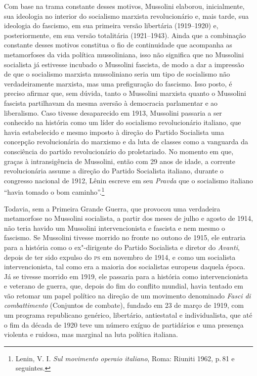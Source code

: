 Com base na trama constante desses motivos, Mussolini elaborou,
inicialmente, sua ideologia no interior do socialismo marxista
revolucionário e, mais tarde, sua ideologia do fascismo, em sua primeira
versão libertária (1919--1920) e, posteriormente, em sua versão
totalitária (1921--1943). Ainda que a combinação constante desses motivos
constitua o fio de continuidade que acompanha as metamorfoses da vida
política mussoliniana, isso não significa que no Mussolini socialista já
estivesse incubado o Mussolini fascista, de modo a dar a impressão de
que o socialismo marxista mussoliniano seria um tipo de socialismo não
verdadeiramente marxista, mas uma prefiguração do fascismo. Isso posto,
é preciso afirmar que, sem dúvida, tanto o Mussolini marxista quanto o
Mussolini fascista partilhavam da mesma aversão à democracia parlamentar
e ao liberalismo. Caso tivesse desaparecido em 1913, Mussolini passaria
a ser conhecido na história como um líder do socialismo revolucionário
italiano, que havia estabelecido e mesmo imposto à direção do Partido
Socialista uma concepção revolucionária do marxismo e da luta de classes
como a vanguarda da consciência do partido revolucionário do
proletariado. No momento em que, graças à intransigência de Mussolini,
então com 29 anos de idade, a corrente revolucionária assume a direção
do Partido Socialista italiano, durante o congresso nacional de 1912,
Lênin escreve em seu \emph{Pravda} que o socialismo italiano ``havia
tomado o bom caminho''.\footnote{Lenin, V. I. \emph{Sul movimento operaio
  italiano}, Roma: Riuniti 1962, p.\,81 e seguintes.}

Todavia, sem a Primeira Grande Guerra, que provocou uma verdadeira
metamorfose no Mussolini socialista, a partir dos meses de julho e
agosto de 1914, não teria havido um Mussolini intervencionista e
fascista e nem mesmo o fascismo. Se Mussolini tivesse morrido no fronte
no outono de 1915, ele entraria para a história como o ex"-dirigente do
Partido Socialista e diretor do \emph{Avanti}, depois de ter sido
expulso do \textsc{ps} em novembro de 1914, e como um socialista
intervencionista, tal como era a maioria dos socialistas europeus
daquela época. Já se tivesse morrido em 1919, ele passaria para a
história como intervencionista e veterano de guerra, que, depois do fim
do conflito mundial, havia tentado em vão retomar um papel político na
direção de um movimento denominado \emph{Fasci di combattimento}
(Conjuntos de combate), fundado em 23 de março de 1919, com um programa
republicano genérico, libertário, antiestatal e individualista, que até
o fim da década de 1920 teve um número exíguo de partidários e uma
presença violenta e ruidosa, mas marginal na luta política italiana.

